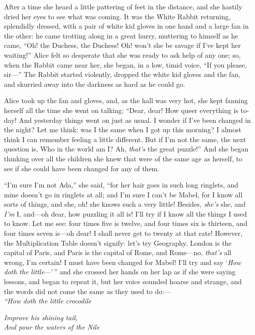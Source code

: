 \documentclass[book, 20pt]{extbook}
\begin{document}
After a time she heard a little pattering of feet in the distance, and
she hastily dried her eyes to see what was coming. It was the White
Rabbit returning, splendidly dressed, with a pair of white kid gloves in
one hand and a large fan in the other: he came trotting along in a great
hurry, muttering to himself as he came, ``Oh! the Duchess, the Duchess!
Oh! won't she be savage if I've kept her waiting!'' Alice felt so
desperate that she was ready to ask help of any one; so, when the Rabbit
came near her, she began, in a low, timid voice, ``If you please,
sir---'' The Rabbit started violently, dropped the white kid gloves and
the fan, and skurried away into the darkness as hard as he could go.

Alice took up the fan and gloves, and, as the hall was very hot, she
kept fanning herself all the time she went on talking: ``Dear, dear! How
queer everything is to-day! And yesterday things went on just as usual.
I wonder if I've been changed in the night? Let me think: was I the same
when I got up this morning? I almost think I can remember feeling a
little different. But if I'm not the same, the next question is, Who in
the world am I? Ah, \emph{that's} the great puzzle!'' And she began
thinking over all the children she knew that were of the same age as
herself, to see if she could have been changed for any of them.

``I'm sure I'm not Ada,'' she said, ``for her hair goes in such long
ringlets, and mine doesn't go in ringlets at all; and I'm sure I can't
be Mabel, for I know all sorts of things, and she, oh! she knows such a
very little! Besides, \emph{she's} she, and \emph{I'm} I, and---oh dear,
how puzzling it all is! I'll try if I know all the things I used to
know. Let me see: four times five is twelve, and four times six is
thirteen, and four times seven is---oh dear! I shall never get to twenty
at that rate! However, the Multiplication Table doesn't signify: let's
try Geography. London is the capital of Paris, and Paris is the capital
of Rome, and Rome---no, \emph{that's} all wrong, I'm certain! I must
have been changed for Mabel! I'll try and say `\emph{How doth the
little}---'\,'' and she crossed her hands on her lap as if she were
saying lessons, and began to repeat it, but her voice sounded hoarse and
strange, and the words did not come the same as they used to do:---\\
\bigskip
\noindent\emph{``How doth the little crocodile}

\emph{Improve his shining tail,\\}
\noindent\emph{And pour the waters of the Nile}
\end{document}
